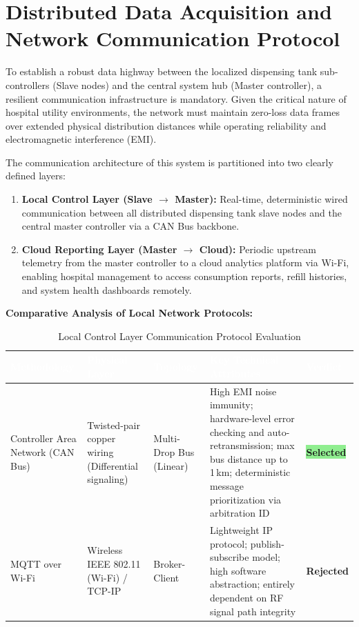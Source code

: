 \documentclass[12pt,a4paper]{article}
\newcommand{\badgegreen}[1]{%
  \colorbox{lightgreen}{\textcolor{badgegreen}{\footnotesize\textbf{#1}}}%
}
\newcommand{\badgered}[1]{%
  \colorbox{lightred}{\textcolor{badgered}{\footnotesize\textbf{#1}}}%
}
\begin{document}
\newpage
\section{Distributed Data Acquisition and Network Communication Protocol}

To establish a robust data highway between the localized dispensing tank sub-controllers (Slave nodes) and the central system hub (Master controller), a resilient communication infrastructure is mandatory. Given the critical nature of hospital utility environments, the network must maintain zero-loss data frames over extended physical distribution distances while operating reliability and electromagnetic interference (EMI).

The communication architecture of this system is partitioned into two clearly defined layers:

\begin{enumerate}
    \item \textbf{Local Control Layer (Slave $\rightarrow$ Master):} Real-time, deterministic wired communication between all distributed dispensing tank slave nodes and the central master controller via a CAN Bus backbone.
    \item \textbf{Cloud Reporting Layer (Master $\rightarrow$ Cloud):} Periodic upstream telemetry from the master controller to a cloud analytics platform via Wi-Fi, enabling hospital management to access consumption reports, refill histories, and system health dashboards remotely.
\end{enumerate}

\vspace{0.3cm}
\noindent\textbf{Comparative Analysis of Local Network Protocols:}

\begin{table}[H]
\centering
\setlength{\tabcolsep}{5pt}
\renewcommand{\arraystretch}{1.4}
\begin{tabular}{|p{3.2cm}|p{3.5cm}|p{2.2cm}|p{3.5cm}|p{2cm}|}
\hline
\rowcolor{headerblue}
\textcolor{white}{\textbf{Methodology}} &
\textcolor{white}{\textbf{Physical Layer}} &
\textcolor{white}{\textbf{Topology}} &
\textcolor{white}{\textbf{Key Technical Attributes}} &
\textcolor{white}{\textbf{Verdict}} \\
\hline
\rowcolor{chosen}
Controller Area Network (CAN Bus) &
Twisted-pair copper wiring (Differential signaling) &
Multi-Drop Bus (Linear) &
High EMI noise immunity; hardware-level error checking and auto-retransmission; max bus distance up to 1\,km; deterministic message prioritization via arbitration ID &
\badgegreen{Selected} \\
\hline
MQTT over Wi-Fi &
Wireless IEEE 802.11 (Wi-Fi) / TCP-IP &
Broker-Client &
Lightweight IP protocol; publish-subscribe model; high software abstraction; entirely dependent on RF signal path integrity &
\badgered{Rejected} \\
\hline
\end{tabular}
\caption{Local Control Layer Communication Protocol Evaluation}
\end{table}
\end{document}
